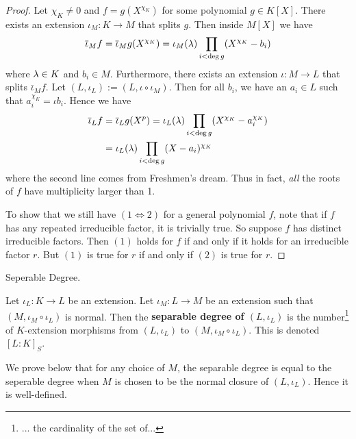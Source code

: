 \documentclass[../book.tex]{subfiles}
\begin{document}
\begin{proof}
        Let $\chi_K \neq 0$ and $f = g(X^{\chi_K})$
        for some polynomial $g \in K[X]$.
        There exists an extension $\iota_M : K \to M$ that splits $g$. 
        Then inside $M[X]$ we have \[
            \overline{\iota}_M f = \overline{\iota}_M g(X^{\chi_K})
            = \iota_M(\lambda) \prod_{i < \deg g} (X^{\chi_K} - b_i)
        \]
        where $\lambda \in K$ and $b_i \in M$. 
        Furthermore, there exists an extension $\iota : M \to L$ 
        that splits $\bar\iota_M f$.
        Let $(L,\iota_L) := (L,\iota\circ\iota_M)$. 
        Then for all $b_i$, we have an $a_i \in L$ such that $a_i^{\chi_K} = \iota b_i$. 
        Hence we have \begin{align*}
            \overline{\iota}_L f &= \overline{\iota}_L g(X^p) 
            = \iota_L(\lambda) \prod_{i < \deg g}  (X^{\chi_K} - a_i^{\chi_K}) \\
            &= \iota_L(\lambda) \prod_{i < \deg g}  (X - a_i)^{\chi_K}  
        \end{align*}
        where the second line comes from Freshmen's dream. 
        Thus in fact, \emph{all} the roots of $f$ have multiplicity larger than 1. 
    
    To show that we still have $(1 \iff 2)$ for a general polynomial $f$,
    note that if $f$ has any repeated irreducible factor, it is trivially true.
    So suppose $f$ has distinct irreducible factors. 
    Then $(1)$ holds for $f$ if and only if it holds for an irreducible factor $r$.
    But $(1)$ is true for $r$ if and only if $(2)$ is true for $r$. 
\end{proof}
\begin{dfn} Seperable Degree. 
    
    Let $\iota_L : K \to L$ be an extension. 
    Let $\iota_M : L \to M$ be an extension such that 
    $(M,\iota_M\circ\iota_L)$ is normal. 
    Then the \textbf{separable degree of $(L,\iota_L)$} is
    the number\footnote{... the cardinality of the set of...}
    of $K$-extension morphisms 
    from $(L,\iota_L)$ to $(M,\iota_M\circ\iota_L)$.
    This is denoted $[L : K]_S$. 
    
    We prove below that for any choice of $M$,
    the separable degree is equal to the seperable degree 
    when $M$ is chosen to be the normal closure of $(L,\iota_L)$.
    Hence it is well-defined.
\end{dfn}
\end{document}
